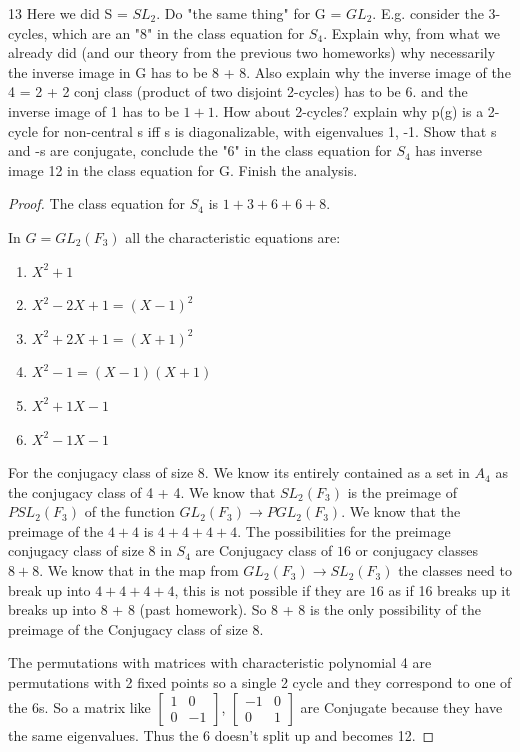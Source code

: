 \documentclass{article}
\begin{document}
\begin{PROB}{13}\label{Problem 13.}
    Here we did S = $SL_2.$ Do "the same thing" for G = $GL_2.$  E.g. consider the 3-cycles, which are an "8" in the class equation for $S_4$. Explain why, from what we already did (and our theory from the previous two homeworks) why necessarily the inverse image in G has to be 8 + 8. Also explain why the inverse image of the 4 = 2 + 2 conj class (product of two disjoint 2-cycles) has to be 6. and the inverse image of 1 has to be $1 + 1$.  How about 2-cycles? explain why p(g) is a 2-cycle for non-central s iff s is diagonalizable, with eigenvalues 1, -1.  Show that s and -s are conjugate, conclude the "6" in the class equation for $S_4$ has inverse image 12 in the class equation for G.  Finish the analysis. 
\end{PROB}
\begin{proof}
    The class equation for $S_4$ is $1 + 3 + 6 + 6 + 8$.

    In $G = GL_2(F_3)$ all the characteristic equations are:

    \begin{enumerate}{}
        \item $X^2 + 1$
        \item $X^2 - 2 X + 1 = (X-1)^2$
        \item $X^2 + 2X + 1 = (X + 1)^2$
        \item $X^2 - 1 = (X - 1)(X + 1)$
        \item $X^2 + 1 X - 1$
        \item $X^2 - 1X - 1$
    \end{enumerate}

    For the conjugacy class of size 8. We know its entirely contained as a set in $A_4$ as the conjugacy class of 4 + 4. We know that $SL_2(F_3)$ is the preimage of $PSL_2(F_3)$ of the function $GL_2(F_3) \to PGL_2(F_3)$. We know that the preimage of the $4 + 4$ is $4 + 4 + 4 + 4$. The possibilities for the preimage conjugacy class of size 8 in $S_4$ are Conjugacy class of $16$ or conjugacy classes $8 + 8$. We know that in the map from $GL_2(F_3) \to SL_2(F_3)$ the classes need to break up into $4 + 4 + 4+ 4$, this is not possible if they are $16$ as if 16 breaks up it breaks up into 8 + 8 (past homework). So 8 + 8 is the only possibility of the preimage of the Conjugacy class of size 8.

    The permutations with matrices with characteristic polynomial 4 are permutations with 2 fixed points so a single 2 cycle and they correspond to one of the 6s. So a matrix like $\begin{bmatrix}
        1 & 0 \\ 0 & -1
    \end{bmatrix}$, $\begin{bmatrix}
        -1 & 0 \\ 0 & 1
    \end{bmatrix}$ are Conjugate because they have the same eigenvalues. Thus the 6 doesn't split up and becomes 12.


\end{proof}
\end{document}
